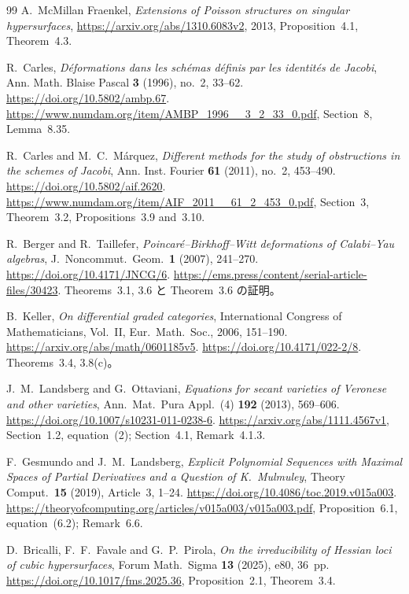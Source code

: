 \begin{thebibliography}{99}
A.~McMillan Fraenkel,
\emph{Extensions of Poisson structures on singular hypersurfaces},
\url{https://arxiv.org/abs/1310.6083v2}, 2013,
Proposition~4.1, Theorem~4.3.

R.~Carles,
\emph{D\'eformations dans les sch\'emas d\'efinis par les identit\'es de Jacobi},
Ann. Math. Blaise Pascal \textbf{3} (1996), no.~2, 33--62.
\url{https://doi.org/10.5802/ambp.67}.
\url{https://www.numdam.org/item/AMBP_1996__3_2_33_0.pdf},
Section~8, Lemma~8.35.

R.~Carles and M.~C.~M\'arquez,
\emph{Different methods for the study of obstructions in the schemes of Jacobi},
Ann. Inst. Fourier \textbf{61} (2011), no.~2, 453--490.
\url{https://doi.org/10.5802/aif.2620}.
\url{https://www.numdam.org/item/AIF_2011__61_2_453_0.pdf},
Section~3, Theorem~3.2, Propositions~3.9 and~3.10.

R.~Berger and R.~Taillefer,
\emph{Poincar\'e--Birkhoff--Witt deformations of Calabi--Yau algebras},
J.~Noncommut.~Geom.~\textbf{1} (2007), 241--270.
\url{https://doi.org/10.4171/JNCG/6}.
\url{https://ems.press/content/serial-article-files/30423}.
Theorems~3.1, 3.6 と Theorem~3.6 の証明。

B.~Keller, \emph{On differential graded categories},
International Congress of Mathematicians, Vol.~II,
Eur.~Math.~Soc., 2006, 151--190.
\url{https://arxiv.org/abs/math/0601185v5}.
\url{https://doi.org/10.4171/022-2/8}.
Theorems~3.4, 3.8(c)。


J.~M.~Landsberg and G.~Ottaviani,
\emph{Equations for secant varieties of Veronese and other varieties},
Ann.~Mat.~Pura Appl.~(4) \textbf{192} (2013), 569--606.
\url{https://doi.org/10.1007/s10231-011-0238-6}.
\url{https://arxiv.org/abs/1111.4567v1},
Section~1.2, equation~(2); Section~4.1, Remark~4.1.3.

F.~Gesmundo and J.~M.~Landsberg,
\emph{Explicit Polynomial Sequences with Maximal Spaces of Partial Derivatives
and a Question of K.~Mulmuley},
Theory Comput.~\textbf{15} (2019), Article~3, 1--24.
\url{https://doi.org/10.4086/toc.2019.v015a003}.
\url{https://theoryofcomputing.org/articles/v015a003/v015a003.pdf},
Proposition~6.1, equation~(6.2); Remark~6.6.

D.~Bricalli, F.~F.~Favale and G.~P.~Pirola,
\emph{On the irreducibility of Hessian loci of cubic hypersurfaces},
Forum Math.~Sigma \textbf{13} (2025), e80, 36~pp.
\url{https://doi.org/10.1017/fms.2025.36},
Proposition~2.1, Theorem~3.4.


\end{thebibliography}
